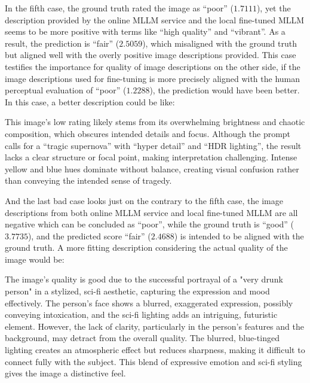 In the fifth case, the ground truth rated the image as ``poor'' ($1.7111$), yet the description provided by the online MLLM service and the local fine-tuned MLLM seems to be more positive with terms like ``high quality'' and ``vibrant''.
As a result, the prediction is ``fair'' ($2.5059$), which misaligned with the ground truth but aligned well with the overly positive image descriptions provided.
This case testifies the importance for quality of image descriptions on the other side, if the image descriptions used for fine-tuning is more precisely aligned with the human perceptual evaluation of ``poor'' ($1.2288$), the prediction would have been better.
In this case, a better description could be like:
\begin{mdframed}[linecolor=black,linewidth=0.5pt,roundcorner=10pt]
This image's low rating likely stems from its overwhelming brightness and chaotic composition, which obscures intended details and focus. Although the prompt calls for a ``tragic supernova'' with ``hyper detail'' and ``HDR lighting'', the result lacks a clear structure or focal point, making interpretation challenging. Intense yellow and blue hues dominate without balance, creating visual confusion rather than conveying the intended sense of tragedy.
\end{mdframed}

And the last bad case looks just on the contrary to the fifth case, the image descriptions from both online MLLM service and local fine-tuned MLLM are all negative which can be concluded as ``poor'', while the ground truth is ``good'' ($3.7735$), and the predicted score ``fair'' ($2.4688$) is intended to be aligned with the ground truth. A more fitting description considering the actual quality of the image would be:
\begin{mdframed}[linecolor=black,linewidth=0.5pt,roundcorner=10pt]
The image's quality is good due to the successful portrayal of a "very drunk person" in a stylized, sci-fi aesthetic, capturing the expression and mood effectively. The person’s face shows a blurred, exaggerated expression, possibly conveying intoxication, and the sci-fi lighting adds an intriguing, futuristic element. However, the lack of clarity, particularly in the person’s features and the background, may detract from the overall quality. The blurred, blue-tinged lighting creates an atmospheric effect but reduces sharpness, making it difficult to connect fully with the subject. This blend of expressive emotion and sci-fi styling gives the image a distinctive feel.
\end{mdframed}
